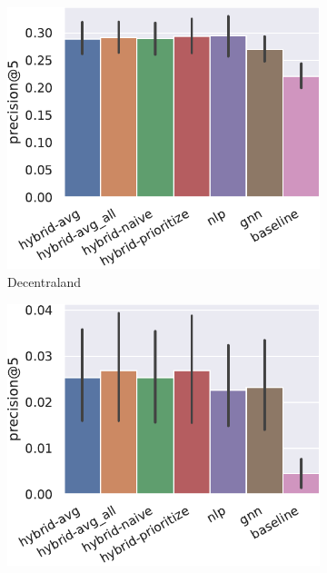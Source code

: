 \begin{figure}[t]
    \centering
    \begin{subfigure}{.24\linewidth}
        \includegraphics[width=\linewidth]{figures/resultados/7_all-metrics-Decentraland-precision@5.pdf}
        \caption{Decentraland}
    \end{subfigure}\hfill\begin{subfigure}{.24\linewidth}
        \includegraphics[width=\linewidth]{figures/resultados/7_all-metrics-DEAD FoundationsDAO-precision@5.pdf}

\end{subfigure}
\end{figure}
